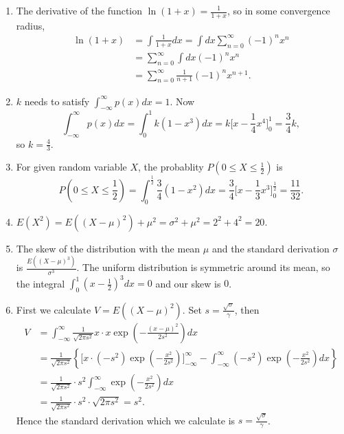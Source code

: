 \documentclass{article}
\begin{document}
\begin{enumerate}
  \item
    The derivative of the function $\ln (1+x) = \frac{1}{1+x}$, so
    in some convergence radius,
    \begin{align*}
      \ln (1+x) &= \int \frac{1}{1+x} dx = \int dx \sum_{n=0}^{\infty} (-1)^n x^n \\
        &= \sum_{n=0}^{\infty} \int dx (-1)^n x^n \\
        &= \sum_{n=0}^{\infty} \frac{1}{n+1} (-1)^n x^{n+1}.
    \end{align*}

  \item 
    $k$ needs to satisfy $\int_{-\infty}^{\infty} p(x) dx = 1$. Now
    $$
      \int_{-\infty}^{\infty} p(x) dx = \int_{0}^{1} k (1-x^3) dx
      = k \bigg[ x - \frac{1}{4} x^4 \bigg]_{0}^{1}  = \frac{3}{4} k,
    $$
    so $k = \frac{4}{3}$.

  \item 
    For given random variable $X$, the probablity $P(0 \leq X \leq \frac{1}{2})$ is
    $$
      P(0 \leq X \leq \frac{1}{2}) = \int_{0}^{\frac{1}{2}} \frac{3}{4} (1-x^2) dx
        = \frac{3}{4} \bigg[ x - \frac{1}{3} x^3 \bigg]_{0}^{\frac{1}{2}} = \frac{11}{32}. 
    $$

  \item
    $E(X^2) = E((X - \mu)^2) + \mu^2 = \sigma^2 + \mu^2 = 2^2 + 4^2 = 20$.
  
  \item 
    The skew of the distribution with the mean $\mu$ and the standard derivation $\sigma$ is
    $\frac{ E((X-\mu)^3) } {\sigma ^3}$.
    The uniform distribution is symmetric around its mean, so the integral $\int_{0}^{1} (x-\frac{1}{2})^3 dx = 0 $ and our skew is $0$.

  \item
    First we calculate $V = E((X-\mu)^2)$. Set $s = \frac{\sqrt{\sigma}}{\gamma}$, then
    \begin{align*}
      V &= 
        \int_{-\infty}^{\infty}
          \frac{1}{\sqrt{2\pi s^2}}
          x \cdot
          x \exp \left( - \frac{(x- \mu)^2}{2 s^2} \right)
          dx \\
      &= \frac{1}{\sqrt{2\pi s^2}}
        \left\{ \bigg[
          x \cdot
          \left( -s^2 \right)
          \exp \left( - \frac{x^2}{2 s^2} \right)
          \bigg]_{-\infty}^{\infty}
          - \int_{-\infty}^{\infty}
          \left( -s^2 \right)
          \exp \left( - \frac{x^2}{2 s^2} \right)
          dx
        \right\} \\
      &= \frac{1}{\sqrt{2\pi s^2}}
        \cdot s^2
        \int_{-\infty}^{\infty}
        \exp \left( - \frac{x^2}{2 s^2} \right)
        dx \\
      &= \frac{1}{\sqrt{2 \pi s^2}}
        \cdot s^2
        \cdot \sqrt{2 \pi s^2} = s^2.
    \end{align*}
    Hence the standard derivation which we calculate is $s = \frac{\sqrt{\sigma}}{\gamma}$.
  

\end{enumerate}
\end{document}
